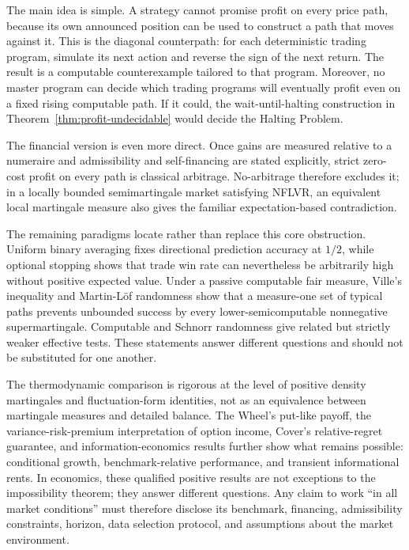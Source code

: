 \documentclass[aps,pra,reprint,superscriptaddress,amsmath,amssymb,floatfix]{revtex4-2}
\theoremstyle{plain}
\theoremstyle{definition}
\theoremstyle{remark}
\begin{document}
The main idea is simple. A strategy cannot promise profit on every price path,
because its own announced position can be used to construct a path that moves
against it. This is the diagonal counterpath: for each deterministic trading
program, simulate its next action and reverse the sign of the next return. The
result is a computable counterexample tailored to that program. Moreover, no
master program can decide which trading programs will eventually profit even
on a fixed rising computable path. If it could, the wait-until-halting
construction in Theorem~\ref{thm:profit-undecidable} would decide the Halting
Problem.

The financial version is even more direct. Once gains are measured relative
to a numeraire and admissibility and self-financing are stated explicitly,
strict zero-cost profit on every path is classical arbitrage. No-arbitrage
therefore excludes it; in a locally bounded semimartingale market satisfying
NFLVR, an equivalent local martingale measure also gives the familiar
expectation-based contradiction.

The remaining paradigms locate rather than replace this core obstruction.
Uniform binary averaging fixes directional prediction accuracy at \(1/2\),
while optional stopping shows that trade win rate can nevertheless be
arbitrarily high without positive expected value. Under a passive computable
fair measure, Ville's inequality and Martin-L\"of randomness show that a
measure-one set of typical paths prevents unbounded success by every
lower-semicomputable nonnegative supermartingale. Computable and Schnorr
randomness give related but strictly weaker effective tests. These statements
answer different questions and should not be substituted for one another.

The thermodynamic comparison is rigorous at the level of positive density
martingales and fluctuation-form identities, not as an equivalence between
martingale measures and detailed balance. The Wheel's put-like payoff,
the variance-risk-premium interpretation of option income, Cover's
relative-regret guarantee, and information-economics results further show what
remains possible: conditional growth, benchmark-relative performance, and
transient informational rents. In economics, these qualified positive results
are not exceptions to the impossibility theorem; they answer different
questions. Any claim to work ``in all market conditions'' must therefore
disclose its benchmark, financing, admissibility constraints, horizon, data
selection protocol, and assumptions about the market environment.
\end{document}
